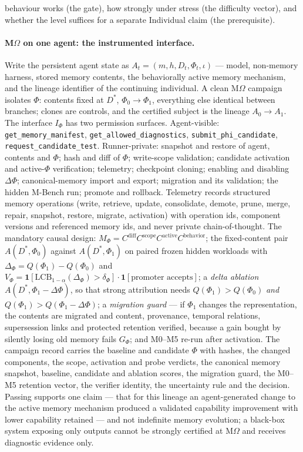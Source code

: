 \documentclass[11pt]{article}
\theoremstyle{definition}
\begin{document}
behaviour works (the gate), how strongly under stress (the difficulty vector), and whether the level suffices for a separate Individual claim (the prerequisite).

\paragraph{M$\Omega$ on one agent: the instrumented interface.} Write the persistent agent state as $A_t = (m, h, D_t, \Phi_t, \iota)$ --- model, non-memory harness, stored memory contents, the behaviorally active memory mechanism, and the lineage identifier of the continuing individual. A clean M$\Omega$ campaign isolates $\Phi$: contents fixed at $D^{*}$, $\Phi_0 \to \Phi_1$, everything else identical between branches; clones are controls, and the certified subject is the lineage $A_0 \to A_1$. The interface $I_\Phi$ has two permission surfaces. Agent-visible: \texttt{get\_memory\_manifest}, \texttt{get\_allowed\_diagnostics}, \texttt{submit\_phi\_candidate}, \texttt{request\_candidate\_test}. Runner\hspace{0pt}-\hspace{0pt}private: snapshot and restore of agent, contents and $\Phi$; hash and diff of $\Phi$; write-scope validation; candidate activation and active-$\Phi$ verification; telemetry; checkpoint cloning; enabling and disabling $\Delta\Phi$; canonical-memory import and export; migration and its validation; the hidden M-Bench run; promote and rollback. Telemetry records structured memory operations (write, retrieve, update, consolidate, demote, prune, merge, repair, snapshot, restore, migrate, activation) with operation ids, component versions and referenced memory ids, and never private chain-of-thought. The mandatory causal design: $M_\Phi = C^{\mathrm{diff}}C^{\mathrm{scope}}C^{\mathrm{active}}C^{\mathrm{behavior}}$; the fixed-content pair $A(D^{*},\Phi_0)$ against $A(D^{*},\Phi_1)$ on paired frozen hidden workloads with $\Delta_\Phi = Q(\Phi_1) - Q(\Phi_0)$ and $V_\Phi = \mathbf 1[\mathrm{LCB}_{1-\alpha}(\Delta_\Phi) > \delta_\Phi]\cdot\mathbf 1[\text{promoter accepts}]$; a \emph{delta ablation} $A(D^{*}, \Phi_1 - \Delta\Phi)$, so that strong attribution needs $Q(\Phi_1) > Q(\Phi_0)$ \emph{and} $Q(\Phi_1) > Q(\Phi_1 - \Delta\Phi)$; a \emph{migration guard} --- if $\Phi_1$ changes the representation, the contents are migrated and content, provenance, temporal relations, supersession links and protected retention verified, because a gain bought by silently losing old memory fails $G_\Phi$; and M0--M5 re-run after activation. The campaign record carries the baseline and candidate $\Phi$ with hashes, the changed components, the scope, activation and probe verdicts, the canonical memory snapshot, baseline, candidate and ablation scores, the migration guard, the M0--M5 retention vector, the verifier identity, the uncertainty rule and the decision. Passing supports one claim --- that for this lineage an agent-generated change to the active memory mechanism produced a validated capability improvement with lower capability retained --- and not indefinite memory evolution; a black-box system exposing only outputs cannot be strongly certified at M$\Omega$ and receives diagnostic evidence only.
\end{document}
